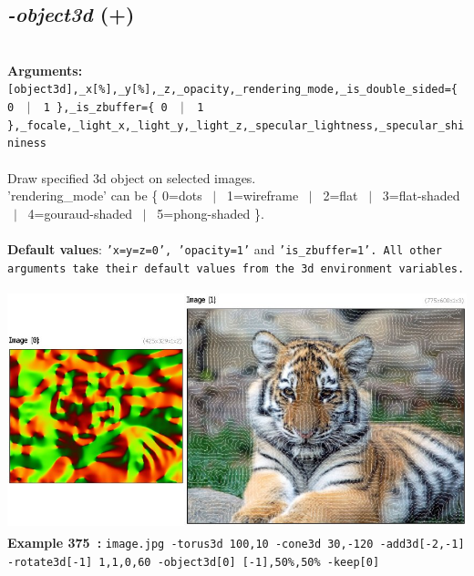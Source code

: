 \documentclass[a4paper,11pt,twoside]{book}
\begin{document}
\subsection{\emph{-object3d} (+)}\vspace*{-0.5em}
~\\\textbf{Arguments: } 
{\small \texttt{[object3d],\_x[\%],\_y[\%],\_z,\_opacity,\_rendering\_mode,\_is\_double\_sided=\{ 0 ~$|$~ 1 \},\_is\_zbuffer=\{ 0 ~$|$~ 1 \},\_focale,\_light\_x,\_light\_y,\_light\_z,\_specular\_lightness,\_specular\_shininess}}\\~\\
Draw specified 3d object on selected images.
~\\'rendering\_mode' can be \{ 0=dots ~$|$~ 1=wireframe ~$|$~ 2=flat ~$|$~ 3=flat-shaded ~$|$~ 4=gouraud-shaded ~$|$~ 5=phong-shaded \}.
~\\~\\\textbf{Default values}: {\small \texttt{'x=y=z=0', 'opacity=1'} and \texttt{'is\_zbuffer=1'. All other arguments take their default values from the 3d environment variables.}}
\begin{center}\includegraphics[keepaspectratio=true,height=7cm,width=\textwidth]{img/gmic_def375.jpg}\\
{\footnotesize \textbf{Example 375~:} \texttt{image.jpg -torus3d 100,10 -cone3d 30,-120 -add3d[-2,-1] -rotate3d[-1] 1,1,0,60 -object3d[0] [-1],50\%,50\% -keep[0]}}
\end{center}
\end{document}
